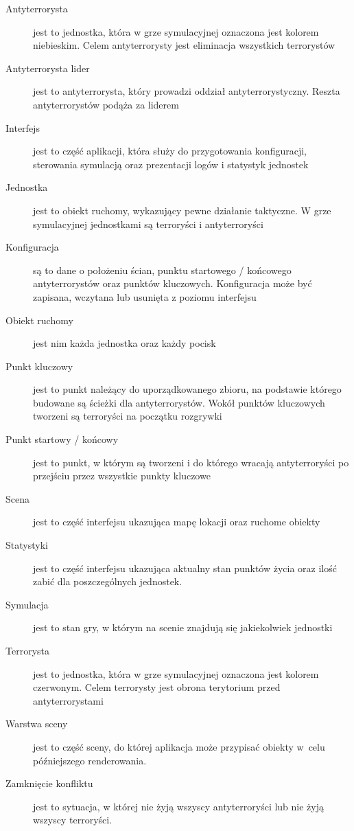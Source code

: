 \begin{description}
	\item[Antyterrorysta] jest to jednostka, która w grze symulacyjnej oznaczona jest kolorem niebieskim. Celem antyterrorysty jest eliminacja wszystkich terrorystów
	\item[Antyterrorysta lider] jest to antyterrorysta, który prowadzi oddział antyterrorystyczny. Reszta antyterrorystów podąża za liderem
	\item[Interfejs] jest to część aplikacji, która służy do przygotowania konfiguracji, sterowania symulacją oraz prezentacji logów i statystyk jednostek
	\item[Jednostka] jest to obiekt ruchomy, wykazujący pewne działanie taktyczne. W grze symulacyjnej jednostkami są terroryści i antyterroryści
	\item[Konfiguracja] są to dane o położeniu ścian, punktu startowego / końcowego antyterrorystów oraz punktów kluczowych. Konfiguracja może być zapisana, wczytana lub usunięta z poziomu interfejsu
	\item[Obiekt ruchomy] jest nim każda jednostka oraz każdy pocisk
	\item[Punkt kluczowy] jest to punkt należący do uporządkowanego zbioru, na podstawie którego budowane są ścieżki dla antyterrorystów. Wokół punktów kluczowych tworzeni są terroryści na początku rozgrywki
	\item[Punkt startowy / końcowy] jest to punkt, w którym są tworzeni i do którego wracają antyterroryści po przejściu przez wszystkie punkty kluczowe
	\item[Scena] jest to część interfejsu ukazująca mapę lokacji oraz ruchome obiekty
	\item[Statystyki] jest to część interfejsu ukazująca aktualny stan punktów życia oraz ilość zabić dla poszczególnych jednostek.
	\item[Symulacja] jest to stan gry, w którym na scenie znajdują się jakiekolwiek jednostki	
	\item[Terrorysta] jest to jednostka, która w grze symulacyjnej oznaczona jest kolorem czerwonym. Celem terrorysty jest obrona terytorium przed antyterrorystami
	\item[Warstwa sceny] jest to część sceny, do której aplikacja może przypisać obiekty w~celu późniejszego renderowania.
	\item[Zamknięcie konfliktu] jest to sytuacja, w której nie żyją wszyscy antyterroryści lub nie żyją wszyscy terroryści.
\end{description}


